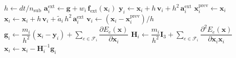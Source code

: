 \begin{algorithm}[!ht]
\caption{VBD step (core comparison). $n_{\mathrm{sub}}$ substeps, each with
         $n_{\mathrm{it}}$ block-descent iterations over the vertices.}
\label{alg:VBDCore}
\begin{algorithmic}[1]
\State $h \gets dt / n_{\mathrm{sub}}$
        \State $\mathbf{a}^{\mathrm{ext}}_i \gets \mathbf{g} + w_i\,\mathbf{f}_{\mathrm{ext}}(\mathbf{x}_i)$
        \State $\mathbf{y}_i \gets \mathbf{x}_i + h\,\mathbf{v}_i + h^2\,\mathbf{a}^{\mathrm{ext}}_i$
        \State $\mathbf{x}^{\mathrm{prev}}_i \gets \mathbf{x}_i$
        \State $\mathbf{x}_i \gets \mathbf{x}_i + h\,\mathbf{v}_i + \tilde{a}_i\,h^2\,\mathbf{a}^{\mathrm{ext}}_i$
    \EndFor
        \State {}
    \EndFor
        \State $\mathbf{v}_i \gets (\mathbf{x}_i - \mathbf{x}^{\mathrm{prev}}_i)/h$
    \EndFor
\EndFor
\Statex
{}
        \State $\mathbf{g}_i \gets \dfrac{m_i}{h^2}(\mathbf{x}_i - \mathbf{y}_i)
                + \displaystyle\sum_{e \in \mathcal{F}_i} \dfrac{\partial E_e(\mathbf{x})}{\partial \mathbf{x}_i}$
        \State $\mathbf{H}_i \gets \dfrac{m_i}{h^2}\mathbf{I}_3
                + \displaystyle\sum_{e \in \mathcal{F}_i} \dfrac{\partial^2 E_e(\mathbf{x})}{\partial \mathbf{x}_i \mathbf{x}_i}$
        \State $\mathbf{x}_i \gets \mathbf{x}_i - \mathbf{H}_i^{-1}\mathbf{g}_i$
    \EndFor
\EndProcedure
\end{algorithmic}
\end{algorithm}

